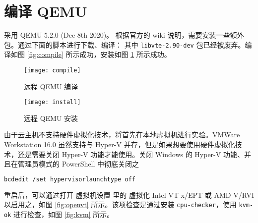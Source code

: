 



    \section{编译 QEMU}
    采用 QEMU 5.2.0 (Dec 8th 2020)。
    根据官方的 wiki 说明\cite{installwiki}，需要安装一些额外包。通过下面的脚本进行下载、编译：
    其中 \verb"libvte-2.90-dev" 包已经被废弃。编译如图 \ref{fig:compile} 所示成功，安装如图 \ref{fig:install} 所示成功。
    \begin{figure}[h]
        \centering
        \begin{minipage}{0.48\textwidth}
            \centering
            \texttt{[image: compile]}
            \caption{远程 QEMU 编译}\label{fig:compile}
        \end{minipage}
        \begin{minipage}{0.48\textwidth}
            \texttt{[image: install]}
            \caption{远程 QEMU 安装}\label{fig:install}
        \end{minipage}
    \end{figure}


     由于云主机不支持硬件虚拟化技术，将首先在本地虚拟机进行实验。VMWare Workstation 16.0 虽然支持与 Hyper-V 并存，但是如果想要使用硬件虚拟化技术，还是需要关闭 Hyper-V 功能才能使用。关闭 Windows 的 Hyper-V 功能、并且在管理员模式的 PowerShell 中彻底关闭之
\begin{lstlisting}[style=commandshell,language=bash]
bcdedit /set hypervisorlaunchtype off
\end{lstlisting}
    重启后，可以通过打开 \textsf{虚拟机设置} 里的 \textsf{虚拟化 Intel VT-x/EPT 或 AMD-V/RVI} 以启用之，如图 \ref{fig:openvt} 所示。该项检查是通过安装 \verb"cpu-checker"，使用 \verb"kvm-ok" 进行检查，如图 \ref{fig:kvm} 所示。

